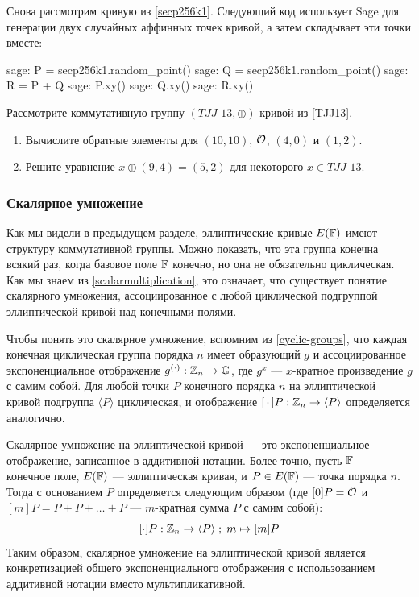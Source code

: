 \begin{example}
Снова рассмотрим кривую  из \examplename{} \ref{secp256k1}. Следующий код использует Sage для генерации двух случайных аффинных точек кривой, а затем складывает эти точки вместе: 
\begin{sagecommandline}
sage: P = secp256k1.random_point()
sage: Q = secp256k1.random_point()
sage: R = P + Q
sage: P.xy()
sage: Q.xy()
sage: R.xy()
\end{sagecommandline}
\end{example}
\begin{exercise}
Рассмотрите коммутативную группу $(\mathit{TJJ\_13},\oplus)$ кривой  из \examplename{} \ref{TJJ13}. 
\begin{enumerate}
\item Вычислите обратные элементы для $(10,10)$, $\mathcal{O}$, $(4,0)$ и $(1,2)$.
\item Решите уравнение $x \oplus (9,4) = (5,2) $ для некоторого $x\in \mathit{TJJ\_13}$.
\end{enumerate}
\end{exercise}

\subsubsection{Скалярное умножение}
Как мы видели в предыдущем разделе, эллиптические кривые $E(\mathbb{F})$ имеют структуру коммутативной группы. Можно показать, что эта группа конечна всякий раз, когда базовое поле $\mathbb{F}$ конечно, но она не обязательно циклическая. Как мы знаем из \eqref{scalarmultiplication}, это означает, что существует понятие скалярного умножения, ассоциированное с любой циклической подгруппой эллиптической кривой над конечными полями.

Чтобы понять это скалярное умножение, вспомним из  \ref{cyclic-groups}, что каждая конечная циклическая группа порядка $n$ имеет образующий $g$ и ассоциированное экспоненциальное отображение $g^{(\cdot)}: \mathbb{Z}_n \to \mathbb{G}$, где $g^x$ — $x$-кратное произведение $g$ с самим собой. Для любой точки $P$ конечного порядка $n$ на эллиптической кривой подгруппа $\langle P\rangle$ циклическая, и отображение $[\,\cdot\,]P:\mathbb{Z}_n\to \langle P\rangle$ определяется аналогично.

Скалярное умножение на эллиптической кривой — это экспоненциальное отображение, записанное в аддитивной нотации. Более точно, пусть $\mathbb{F}$ — конечное поле, $E(\mathbb{F})$ — эллиптическая кривая, и $P\in E(\mathbb{F})$ — точка порядка $n$. Тогда  с основанием $P$ определяется следующим образом (где $[0]P = \mathcal{O}$ и $[m]P = P+P+\ldots + P$ — $m$-кратная сумма $P$ с самим собой):
$$
[\cdot]P: \mathbb{Z}_n \to \langle P\rangle\;;\; m \mapsto [m]P
$$
Таким образом, скалярное умножение на эллиптической кривой является конкретизацией общего экспоненциального отображения с использованием аддитивной нотации вместо мультипликативной.

